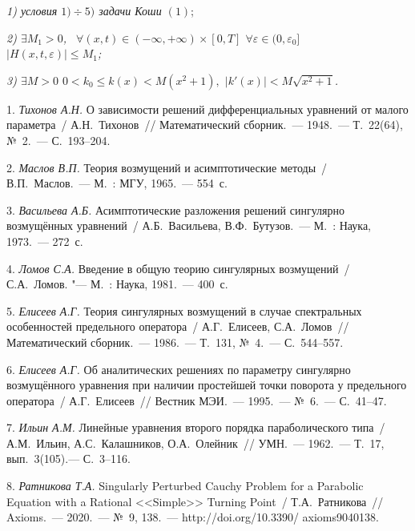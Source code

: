 {\it 1) условия $1)\div 5)$ задачи Коши $(1)$};

{\it 2) $\exists M_1>0$, \ $\forall(x,t)\in(-\infty,+\infty)\times[0,T]$ $\forall\varepsilon\in(0,\varepsilon_0]$ \\
$|H(x,t,\varepsilon)|\le M_1$;}

{\it 3) $\exists M>0$ $0<k_0\leq k(x)<M(x^2+1),$ $|k'(x)|<M \sqrt{x^2+1}$.}

\noindent {\it Тогда $\exists \mathbb{C}>0$ $\forall(x,t)\in(-\infty,+\infty)\times[0,T]$ $\forall\varepsilon\in(0,\varepsilon_0]$ $|R_N(x,t,\varepsilon)|\le \mathbb{C}.$ }

\litlist

1. {\it Тихонов А.Н.} О зависимости решений дифференциальных уравнений от малого параметра~/ А.Н.~Тихонов~// Математический сборник.~--- 1948.~--- Т.~22(64), №~2.~--- С.~193--204.

2. {\it Маслов В.П.} Теория возмущений и асимптотические методы~/ В.П.~Маслов.~--- М.~: МГУ, 1965.~--- 554~с.

3. {\it Васильева А.Б.} Асимптотические разложения решений сингулярно возмущённых уравнений~/ А.Б.~Васильева, В.Ф.~Бутузов.~--- М.~: Наука, 1973.~--- 272~с.

4. {\it Ломов С.А.} Введение в общую теорию сингулярных возмущений~/ С.А.~Ломов. "--- М.~: Наука, 1981.~--- 400~с.

5. {\it Елисеев А.Г.} Теория сингулярных возмущений в случае спектральных особенностей предельного оператора~/ А.Г.~Елисеев, \linebreak С.А.~Ломов~// Математический сборник.~--- 1986.~--- Т.~131, №~4.~--- С.~544--557.

6. {\it Елисеев А.Г.} Об аналитических решениях по параметру сингулярно возмущённого уравнения при наличии простейшей точки поворота у предельного оператора~/ А.Г.~Елисеев~// Вестник МЭИ.~--- 1995.~--- №~6.~--- С.~41--47.

7. {\it Ильин А.М.} Линейные уравнения второго порядка параболического типа~/ А.М.~Ильин, А.С.~Калашников, О.А.~Олейник~// УМН.~--- 1962.~--- Т.~17, вып.~3(105).--- С.~3--116.

8. {\it Ратникова Т.А.} \foreignlanguage{english}{Singularly Perturbed Cauchy Problem for a Parabolic Equation with a Rational <<Simple>> Turning Point}~/ Т.А.~Ратникова~// \foreignlanguage{english}{Axioms}.~--- 2020.~--- №~9, 138.~--- http://doi.org/10.3390/ axioms9040138.
